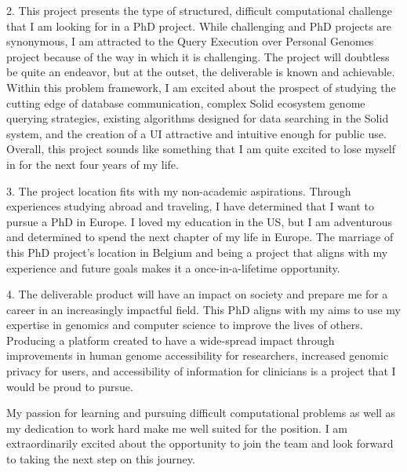 2. This project presents the type of structured, difficult computational challenge that I am looking for in a PhD project. 
While challenging and PhD projects are synonymous, I am attracted to the Query Execution over Personal Genomes project because of the way in which it is challenging. 
The project will doubtless be quite an endeavor, but at the outset, the deliverable is known and achievable. 
Within this problem framework, I am excited about the prospect of studying the cutting edge of database communication, complex Solid ecosystem genome querying strategies, existing algorithms designed for data searching in the Solid system, and the creation of a UI attractive and intuitive enough for public use. 
Overall, this project sounds like something that I am quite excited to lose myself in for the next four years of my life. 

3. The project location fits with my non-academic aspirations. 
Through experiences studying abroad and traveling, I have determined that I want to pursue a PhD in Europe. 
I loved my education in the US, but I am adventurous and determined to spend the next chapter of my life in Europe. 
The marriage of this PhD project’s location in Belgium and being a project that aligns with my experience and future goals makes it a once-in-a-lifetime opportunity.

4. The deliverable product will have an impact on society and prepare me for a career in an increasingly impactful field. 
This PhD aligns with my aims to use my expertise in genomics and computer science to improve the lives of others. 
Producing a platform created to have a wide-spread impact through improvements in human genome accessibility for researchers, increased genomic privacy for users, and accessibility of information for clinicians is a project that I would be proud to pursue.

My passion for learning and pursuing difficult computational problems as well as my dedication to work hard make me well suited for the position. 
I am extraordinarily excited about the opportunity to join the team and look forward to taking the next step on this journey.


